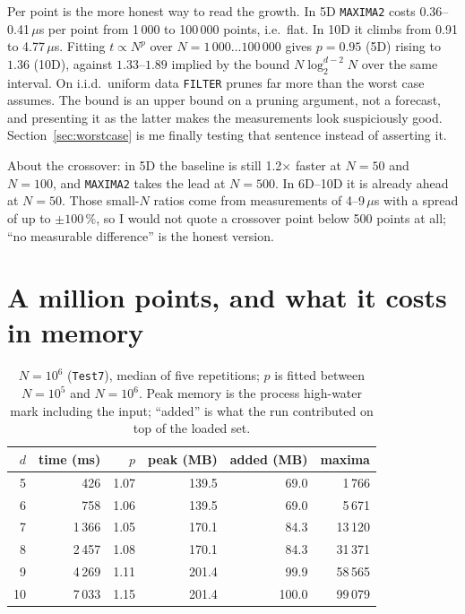 \documentclass[11pt,a4paper]{article}
\newcommand{\code}[1]{\texttt{#1}}
\begin{document}
Per point is the more honest way to read the growth. In 5D \code{MAXIMA2} costs
0.36--0.41\,$\mu$s per point from 1\,000 to 100\,000 points, i.e.\ flat. In 10D
it climbs from 0.91 to 4.77\,$\mu$s. Fitting $t \propto N^p$ over
$N=1\,000\ldots100\,000$ gives $p = 0.95$ (5D) rising to $1.36$ (10D), against
$1.33$--$1.89$ implied by the bound $N\log_2^{d-2}N$ over the same interval. On i.i.d.\ uniform data \code{FILTER} prunes far
more than the worst case assumes. The bound is an upper bound on a pruning
argument, not a forecast, and presenting it as the latter makes the
measurements look suspiciously good. Section~\ref{sec:worstcase} is me finally
testing that sentence instead of asserting it.





About the crossover: in 5D the baseline is still 1.2$\times$ faster at $N=50$
and $N=100$, and \code{MAXIMA2} takes the lead at $N=500$. In 6D--10D it is
already ahead at $N=50$. Those small-$N$ ratios come from measurements of
4--9\,$\mu$s with a spread of up to $\pm100\,\%$, so I would not quote a
crossover point below 500 points at all; ``no measurable difference'' is the
honest version.

\section{A million points, and what it costs in memory}

\begin{table}[htbp]
\centering
\small
\caption{$N=10^6$ (\code{Test7}), median of five repetitions; $p$ is fitted
between $N=10^5$ and $N=10^6$. Peak memory is the process high-water mark
including the input; ``added'' is what the run contributed on top of the loaded
set.}
\label{tab:million}
\begin{tabular}{rrrrrr}
\toprule
$d$ & time (ms) & $p$ & peak (MB) & added (MB) & maxima \\
\midrule
 5 &     426 & 1.07 & 139.5 & 69.0 &  1\,766 \\
 6 &     758 & 1.06 & 139.5 & 69.0 &  5\,671 \\
 7 &   1\,366 & 1.05 & 170.1 & 84.3 & 13\,120 \\
 8 &   2\,457 & 1.08 & 170.1 & 84.3 & 31\,371 \\
 9 &   4\,269 & 1.11 & 201.4 & 99.9 & 58\,565 \\
10 &   7\,033 & 1.15 & 201.4 & 100.0 & 99\,079 \\
\bottomrule
\end{tabular}
\end{table}
\end{document}

